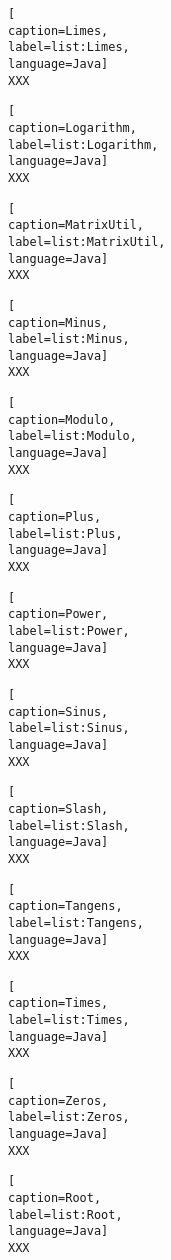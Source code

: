 \begin{lstlisting}[
caption=Limes,
label=list:Limes,
language=Java]
XXX
\end{lstlisting}    

\begin{lstlisting}[
caption=Logarithm,
label=list:Logarithm,
language=Java]
XXX
\end{lstlisting}    

\begin{lstlisting}[
caption=MatrixUtil,
label=list:MatrixUtil,
language=Java]
XXX
\end{lstlisting}    

\begin{lstlisting}[
caption=Minus,
label=list:Minus,
language=Java]
XXX
\end{lstlisting}    

\begin{lstlisting}[
caption=Modulo,
label=list:Modulo,
language=Java]
XXX
\end{lstlisting}    

\begin{lstlisting}[
caption=Plus,
label=list:Plus,
language=Java]
XXX
\end{lstlisting}    

\begin{lstlisting}[
caption=Power,
label=list:Power,
language=Java]
XXX
\end{lstlisting}    

\begin{lstlisting}[
caption=Sinus,
label=list:Sinus,
language=Java]
XXX
\end{lstlisting}    

\begin{lstlisting}[
caption=Slash,
label=list:Slash,
language=Java]
XXX
\end{lstlisting}    

\begin{lstlisting}[
caption=Tangens,
label=list:Tangens,
language=Java]
XXX
\end{lstlisting}    

\begin{lstlisting}[
caption=Times,
label=list:Times,
language=Java]
XXX
\end{lstlisting}    

\begin{lstlisting}[
caption=Zeros,
label=list:Zeros,
language=Java]
XXX
\end{lstlisting}    

\begin{lstlisting}[
caption=Root,
label=list:Root,
language=Java]
XXX
\end{lstlisting}    

